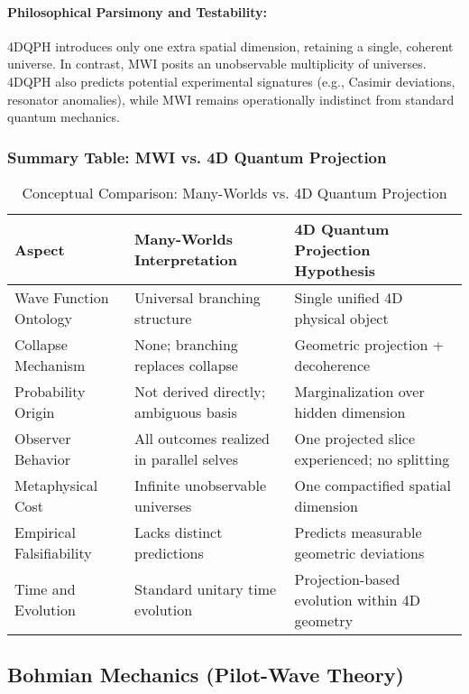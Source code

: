 \documentclass[12pt]{article}
\begin{document}
\paragraph{Philosophical Parsimony and Testability:}
4DQPH introduces only one extra spatial dimension, retaining a single, coherent universe. In contrast, MWI posits an unobservable multiplicity of universes. 4DQPH also predicts potential experimental signatures (e.g., Casimir deviations, resonator anomalies), while MWI remains operationally indistinct from standard quantum mechanics.

\subsubsection*{Summary Table: MWI vs. 4D Quantum Projection}

\begin{table}[H]
\centering
\renewcommand{\arraystretch}{1.3}
\begin{tabular}{|p{4cm}|p{5cm}|p{5cm}|}
\hline
\textbf{Aspect} & \textbf{Many-Worlds Interpretation} & \textbf{4D Quantum Projection Hypothesis} \\
\hline
Wave Function Ontology & Universal branching structure & Single unified 4D physical object \\
\hline
Collapse Mechanism & None; branching replaces collapse & Geometric projection + decoherence \\
\hline
Probability Origin & Not derived directly; ambiguous basis & Marginalization over hidden dimension \\
\hline
Observer Behavior & All outcomes realized in parallel selves & One projected slice experienced; no splitting \\
\hline
Metaphysical Cost & Infinite unobservable universes & One compactified spatial dimension \\
\hline
Empirical Falsifiability & Lacks distinct predictions & Predicts measurable geometric deviations \\
\hline
Time and Evolution & Standard unitary time evolution & Projection-based evolution within 4D geometry \\
\hline
\end{tabular}
\caption{Conceptual Comparison: Many-Worlds vs. 4D Quantum Projection}
\end{table}

\subsection{Bohmian Mechanics (Pilot-Wave Theory)}
\end{document}
